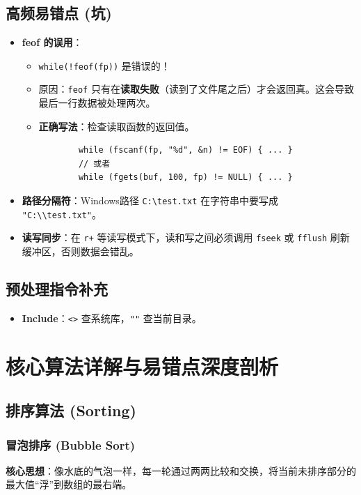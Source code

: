 \documentclass[a4paper,12pt]{article}
\begin{document}
\subsection{高频易错点 (坑)}
\begin{itemize}
    \item \textbf{feof 的误用}：
    \begin{itemize}
        \item \texttt{while(!feof(fp))} 是错误的！
        \item 原因：\texttt{feof} 只有在\textbf{读取失败}（读到了文件尾之后）才会返回真。这会导致最后一行数据被处理两次。
        \item \textbf{正确写法}：检查读取函数的返回值。
        \begin{lstlisting}
        while (fscanf(fp, "%d", &n) != EOF) { ... }
        // 或者
        while (fgets(buf, 100, fp) != NULL) { ... }
        \end{lstlisting}
    \end{itemize}
    \item \textbf{路径分隔符}：Windows路径 \texttt{C:\textbackslash test.txt} 在字符串中要写成 \texttt{"C:\textbackslash\textbackslash test.txt"}。
    \item \textbf{读写同步}：在 \texttt{r+} 等读写模式下，读和写之间必须调用 \texttt{fseek} 或 \texttt{fflush} 刷新缓冲区，否则数据会错乱。
\end{itemize}

\subsection{预处理指令补充}
\begin{itemize}
    \item \textbf{Include}：\texttt{<>} 查系统库，\texttt{""} 查当前目录。
\end{itemize}

\section{核心算法详解与易错点深度剖析}

\subsection{排序算法 (Sorting)}

\subsubsection{冒泡排序 (Bubble Sort)}
\textbf{核心思想}：像水底的气泡一样，每一轮通过两两比较和交换，将当前未排序部分的最大值“浮”到数组的最右端。
\end{document}
